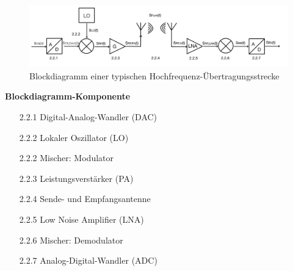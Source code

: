 \begin{figure}[h]
    \centering
    \includegraphics[width=1\textwidth]{Pictures/Blockdiagramm.jpg}   
    \caption{Blockdiagramm einer typischen Hochfrequenz-Übertragungsstrecke}
\end{figure}
\clearpage

\begin{minipage}{0.48\textwidth}
    \raggedright
    \textbf{\large Blockdiagramm-Komponente}\\[2ex]
    \begin{enumerate}
        \item [2.2.1] Digital-Analog-Wandler (DAC)
        \item [2.2.2] Lokaler Oszillator (LO)
        \item [2.2.2] Mischer: Modulator
        \item [2.2.3] Leistungsverstärker (PA)
        \item [2.2.4] Sende- und Empfangsantenne
        \item [2.2.5] Low Noise Amplifier (LNA)
        \item [2.2.6] Mischer: Demodulator
        \item [2.2.7] Analog-Digital-Wandler (ADC)
        
    \end{enumerate}
\end{minipage}%
\hfill
